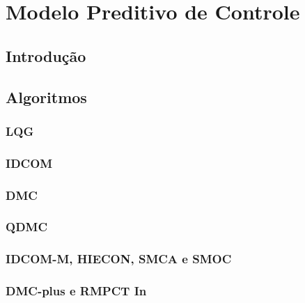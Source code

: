 \chapter{Modelo Preditivo de Controle}
\label{ch:mpc}

\section{Introdução}


\section{Algoritmos}
\label{sec:algoritmos}


\subsection{LQG}
\label{subsec:lqg}


\subsection{IDCOM}
\label{subsec:idcom}


\subsection{DMC}
\label{subsec:dmc}


\subsection{QDMC}
\label{subsec:qdmc}


\subsection{IDCOM-M, HIECON, SMCA e SMOC}
\label{subsec:idcomm}


\subsection{DMC-plus e RMPCT In}
\label{subsec:dmcplus}

